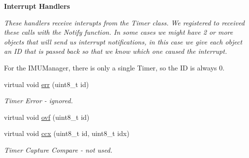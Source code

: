 \begin{Indent}{\bf Interrupt Handlers}\par
{\em These handlers receive interupts from the Timer class. We registered to received these calls with the Notify function. In some cases we might have 2 or more objects that will send us interrupt notifications, in this case we give each object an ID that is passed back so that we know which one caused the interrupt.

For the IMUManager, there is only a single Timer, so the ID is always 0. }\begin{DoxyCompactItemize}
\item 
virtual void \hyperlink{class_i_m_u_ae56d268445b752f9720c814cb294ba40}{err} (uint8\_\-t id)
\begin{DoxyCompactList}\small\item\em Timer Error -\/ ignored. \item\end{DoxyCompactList}\item 
virtual void \hyperlink{class_i_m_u_aefbd4e2f7f3928cf44c00a96d61c3546}{ovf} (uint8\_\-t id)
\item 
virtual void \hyperlink{class_i_m_u_ad2215ab5585c1f9512b91ef309dabf88}{ccx} (uint8\_\-t id, uint8\_\-t idx)
\begin{DoxyCompactList}\small\item\em Timer Capture Compare -\/ not used. \item\end{DoxyCompactList}\end{DoxyCompactItemize}
\end{Indent}
